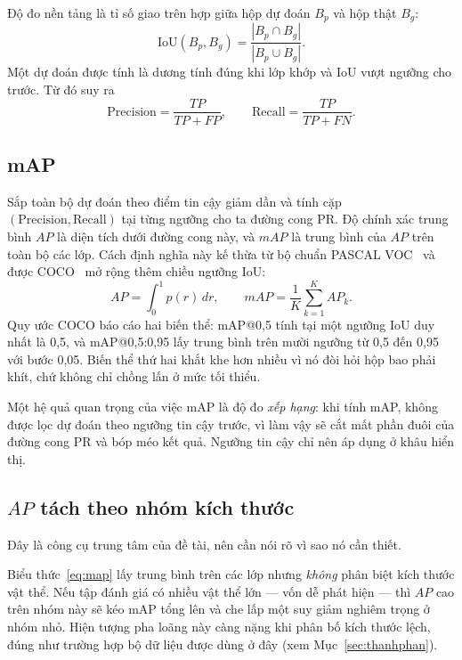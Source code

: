 Độ đo nền tảng là tỉ số giao trên hợp giữa hộp dự đoán $B_p$ và hộp thật $B_g$:
\begin{equation}
\label{eq:iou}
\text{IoU}(B_p, B_g) = \frac{|B_p \cap B_g|}{|B_p \cup B_g|} .
\end{equation}
Một dự đoán được tính là dương tính đúng khi lớp khớp và IoU vượt ngưỡng cho trước. Từ đó suy ra
\begin{equation}
\label{eq:pr}
\text{Precision} = \frac{TP}{TP + FP}, \qquad
\text{Recall} = \frac{TP}{TP + FN}.
\end{equation}

\subsection{mAP}

Sắp toàn bộ dự đoán theo điểm tin cậy giảm dần và tính cặp $(\text{Precision}, \text{Recall})$ tại
từng ngưỡng cho ta đường cong PR. Độ chính xác trung bình $AP$ là diện tích dưới đường cong này, và
$mAP$ là trung bình của $AP$ trên toàn bộ các lớp. Cách định nghĩa này kế thừa từ bộ chuẩn PASCAL
VOC~\cite{everingham2010pascalvoc} và được COCO~\cite{lin2014coco} mở rộng thêm chiều ngưỡng IoU:
\begin{equation}
\label{eq:map}
AP = \int_{0}^{1} p(r)\, dr, \qquad
mAP = \frac{1}{K} \sum_{k=1}^{K} AP_k .
\end{equation}
Quy ước COCO báo cáo hai biến thể: mAP@0,5 tính tại một ngưỡng IoU duy nhất là 0,5, và
mAP@0,5:0,95 lấy trung bình trên mười ngưỡng từ 0,5 đến 0,95 với bước 0,05. Biến thể thứ hai khắt
khe hơn nhiều vì nó đòi hỏi hộp bao phải khít, chứ không chỉ chồng lấn ở mức tối thiểu.

Một hệ quả quan trọng của việc mAP là độ đo \emph{xếp hạng}: khi tính mAP, không được lọc dự đoán
theo ngưỡng tin cậy trước, vì làm vậy sẽ cắt mất phần đuôi của đường cong PR và bóp méo kết quả.
Ngưỡng tin cậy chỉ nên áp dụng ở khâu hiển thị.

\subsection{$AP$ tách theo nhóm kích thước}
\label{sec:ap_theo_kichthuoc}

Đây là công cụ trung tâm của đề tài, nên cần nói rõ vì sao nó cần thiết.

Biểu thức~\eqref{eq:map} lấy trung bình trên các lớp nhưng \emph{không} phân biệt kích thước vật
thể. Nếu tập đánh giá có nhiều vật thể lớn --- vốn dễ phát hiện --- thì $AP$ cao trên nhóm này sẽ
kéo mAP tổng lên và che lấp một suy giảm nghiêm trọng ở nhóm nhỏ. Hiện tượng pha loãng này càng
nặng khi phân bố kích thước lệch, đúng như trường hợp bộ dữ liệu được dùng ở đây (xem
Mục~\ref{sec:thanhphan}).

